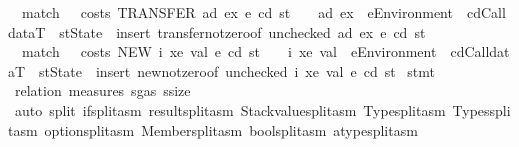 \begin{isabellebody}
\ \ match\ \ \ {\isachardoublequoteopen}costs\ {\isacharparenleft}{\kern0pt}TRANSFER\ ad\ ex{\isacharparenright}{\kern0pt}\ e\ cd\ st\ {\isacharless}{\kern0pt}\ {\isacharunderscore}{\kern0pt}{\isachardoublequoteclose}\ \ ad\ ex\ \ e{\isacharcolon}{\kern0pt}{\isacharcolon}{\kern0pt}Environment\ \ cd{\isacharcolon}{\kern0pt}{\isacharcolon}{\kern0pt}CalldataT\ \ st{\isacharcolon}{\kern0pt}{\isacharcolon}{\kern0pt}State\ {\isasymRightarrow}\ {\isacartoucheopen}insert\ transfer{\isacharunderscore}{\kern0pt}not{\isacharunderscore}{\kern0pt}zero{\isacharbrackleft}{\kern0pt}of\ {\isacharparenleft}{\kern0pt}unchecked{\isacharparenright}{\kern0pt}\ ad\ ex\ e\ cd\ st{\isacharbrackright}{\kern0pt}{\isacartoucheclose}\ {\isacharbar}{\kern0pt}\isanewline
\ \ match\ \ \ {\isachardoublequoteopen}costs\ {\isacharparenleft}{\kern0pt}NEW\ i\ xe\ val{\isacharparenright}{\kern0pt}\ e\ cd\ st\ {\isacharless}{\kern0pt}\ {\isacharunderscore}{\kern0pt}{\isachardoublequoteclose}\ \ i\ xe\ val\ \ e{\isacharcolon}{\kern0pt}{\isacharcolon}{\kern0pt}Environment\ \ cd{\isacharcolon}{\kern0pt}{\isacharcolon}{\kern0pt}CalldataT\ \ st{\isacharcolon}{\kern0pt}{\isacharcolon}{\kern0pt}State\ {\isasymRightarrow}\ {\isacartoucheopen}insert\ new{\isacharunderscore}{\kern0pt}not{\isacharunderscore}{\kern0pt}zero{\isacharbrackleft}{\kern0pt}of\ {\isacharparenleft}{\kern0pt}unchecked{\isacharparenright}{\kern0pt}\ i\ xe\ val\ e\ cd\ st{\isacharbrackright}{\kern0pt}{\isacartoucheclose}\isanewline
\isanewline
{}\isamarkupfalse%
\ stmt\isanewline
%
\isadelimproof
\ \ %
\endisadelimproof
%
\isatagproof
{}\isamarkupfalse%
\ {\isacharparenleft}{\kern0pt}relation\ {\isachardoublequoteopen}measures\ {\isacharbrackleft}{\kern0pt}sgas{\isacharcomma}{\kern0pt}\ ssize{\isacharbrackright}{\kern0pt}{\isachardoublequoteclose}{\isacharparenright}{\kern0pt}\isanewline
\ \ \isamarkupfalse%
\ {\isacharparenleft}{\kern0pt}auto\ split{\isacharcolon}{\kern0pt}\ if{\isacharunderscore}{\kern0pt}split{\isacharunderscore}{\kern0pt}asm\ result{\isachardot}{\kern0pt}split{\isacharunderscore}{\kern0pt}asm\ Stackvalue{\isachardot}{\kern0pt}split{\isacharunderscore}{\kern0pt}asm\ Type{\isachardot}{\kern0pt}split{\isacharunderscore}{\kern0pt}asm\ Types{\isachardot}{\kern0pt}split{\isacharunderscore}{\kern0pt}asm\ option{\isachardot}{\kern0pt}split{\isacharunderscore}{\kern0pt}asm\ Member{\isachardot}{\kern0pt}split{\isacharunderscore}{\kern0pt}asm\ bool{\isachardot}{\kern0pt}split{\isacharunderscore}{\kern0pt}asm\ atype{\isachardot}{\kern0pt}split{\isacharunderscore}{\kern0pt}asm{\isacharparenright}{\kern0pt}\isanewline

\end{isabellebody}
